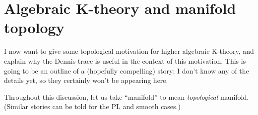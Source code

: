 \section{Algebraic K-theory and manifold topology}
\label{manifolds}

I now want to give some topological motivation for higher algebraic K-theory, and explain why the Dennis trace is useful in the context of this motivation. This is going to be an outline of a (hopefully compelling) story; I don't know any of the details yet, so they certainly won't be appearing here. 

\begin{convention}
  \label{manfiolds-topological}
  Throughout this discussion, let us take ``manifold'' to mean \emph{topological} manifold. (Similar stories can be told for the PL and smooth cases.)
\end{convention}

